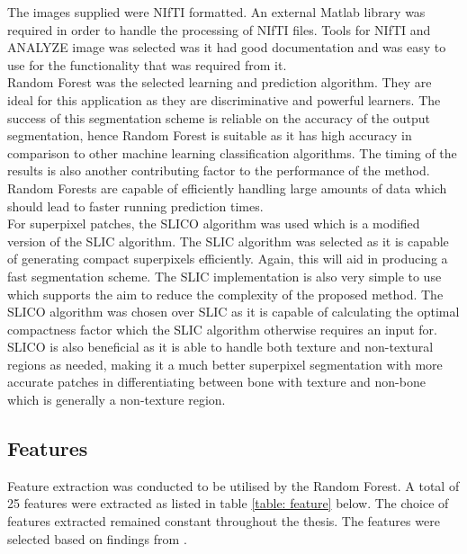 The images supplied were NIfTI formatted. An external Matlab library was required in order to handle the processing of NIfTI files. Tools for NIfTI and  ANALYZE image was selected was it had good documentation and was easy to use for the functionality that was required from it.
\\[1\baselineskip]
Random Forest was the selected learning and prediction algorithm. They are ideal for this application as they are discriminative and powerful learners. The success of this  segmentation scheme is reliable on the accuracy of the output segmentation, hence Random Forest is suitable as it has high accuracy in comparison to other machine learning classification algorithms. The timing of the results is also another contributing factor to the performance of the method. Random Forests are capable of efficiently handling large amounts of data which should lead to faster running prediction times.
\\[1\baselineskip]
For superpixel patches, the SLICO algorithm was used which is a modified version of the SLIC algorithm. The SLIC algorithm was selected as it is capable of generating compact superpixels efficiently. Again, this will aid in producing a fast segmentation scheme. The SLIC implementation is also very simple to use which supports the aim to reduce the complexity of the proposed method. The SLICO algorithm was chosen over SLIC as it is capable of calculating the optimal compactness factor which the SLIC algorithm otherwise requires an input for. SLICO is also beneficial as it is able to handle both texture and non-textural regions as needed, making it a much better superpixel segmentation with more accurate patches in differentiating between bone with texture and non-bone which is generally a  non-texture region. 

\subsection{Features}
\label{sect:features}
Feature extraction was conducted to be utilised by the Random Forest. A total of 25 features were extracted as listed in table \ref{table: feature} below. The choice of features extracted remained constant throughout the thesis. The features were selected based on findings from \cite{paper:multires}.

